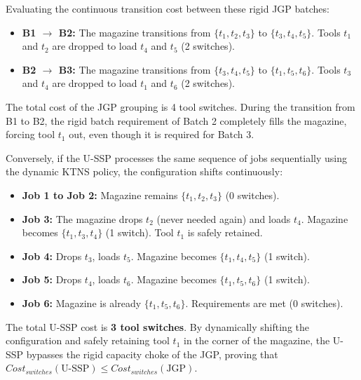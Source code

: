 \documentclass[12pt]{article}
\begin{document}
Evaluating the continuous transition cost between these rigid JGP batches:
\begin{itemize}[noitemsep]
	\item \textbf{B1 $\to$ B2:} The magazine transitions from $\{t_1, t_2, t_3\}$ to $\{t_3, t_4, t_5\}$. Tools $t_1$ and $t_2$ are dropped to load $t_4$ and $t_5$ (2 switches).
	\item \textbf{B2 $\to$ B3:} The magazine transitions from $\{t_3, t_4, t_5\}$ to $\{t_1, t_5, t_6\}$. Tools $t_3$ and $t_4$ are dropped to load $t_1$ and $t_6$ (2 switches).
\end{itemize}

The total cost of the JGP grouping is 4 tool switches. During the transition from B1 to B2, the rigid batch requirement of Batch 2 completely fills the magazine, forcing tool $t_1$ out, even though it is required for Batch 3.

Conversely, if the U-SSP processes the same sequence of jobs sequentially using the dynamic KTNS policy, the configuration shifts continuously:
\begin{itemize}[noitemsep]
	\item \textbf{Job 1 to Job 2:} Magazine remains $\{t_1, t_2, t_3\}$ (0 switches).
	\item \textbf{Job 3:} The magazine drops $t_2$ (never needed again) and loads $t_4$. Magazine becomes $\{t_1, t_3, t_4\}$ (1 switch). Tool $t_1$ is safely retained.
	\item \textbf{Job 4:} Drops $t_3$, loads $t_5$. Magazine becomes $\{t_1, t_4, t_5\}$ (1 switch).
	\item \textbf{Job 5:} Drops $t_4$, loads $t_6$. Magazine becomes $\{t_1, t_5, t_6\}$ (1 switch).
	\item \textbf{Job 6:} Magazine is already $\{t_1, t_5, t_6\}$. Requirements are met (0 switches).
\end{itemize}

The total U-SSP cost is \textbf{3 tool switches}. By dynamically shifting the configuration and safely retaining tool $t_1$ in the corner of the magazine, the U-SSP bypasses the rigid capacity choke of the JGP, proving that $Cost_{switches}(\text{U-SSP}) \le Cost_{switches}(\text{JGP})$.
\end{document}
